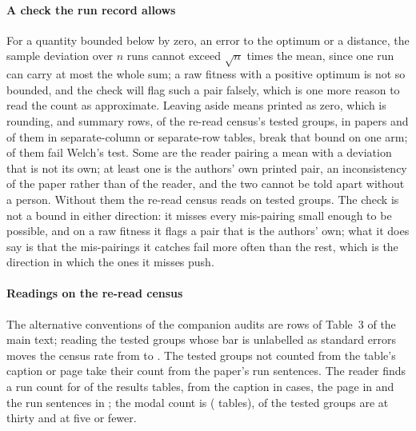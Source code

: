 \documentclass[preprint,review,12pt]{elsarticle}
\begin{document}
\paragraph{A check the run record allows} For a quantity bounded below by zero, an error to the optimum or a distance, the sample deviation over $n$ runs cannot exceed $\sqrt{n}$ times the mean, since one run can carry at most the whole sum; a raw fitness with a positive optimum is not so bounded, and the check will flag such a pair falsely, which is one more reason to read the count as approximate. Leaving aside means printed as zero, which is rounding, and summary rows, \nCrcAlImpossiblePairs{} of the re-read census's tested groups, in \nCrcAlImpossiblePairsPapers{} papers and \nCrcAlImpossiblePairsSeparate{} of them in separate-column or separate-row tables, break that bound on one arm; \nCrcAlImpossiblePairsFail{} of them fail Welch's test. Some are the reader pairing a mean with a deviation that is not its own; at least one is the authors' own printed pair, an inconsistency of the paper rather than of the reader, and the two cannot be told apart without a person. Without them the re-read census reads \nCrcAlWithoutImpossibleFail{} \nCrcAlWithoutImpossibleFailCi{} on \nCrcAlWithoutImpossibleTested{} tested groups. The check is not a bound in either direction: it misses every mis-pairing small enough to be possible, and on a raw fitness it flags a pair that is the authors' own; what it does say is that the mis-pairings it catches fail more often than the rest, which is the direction in which the ones it misses push.

\paragraph{Readings on the re-read census} The alternative conventions of the companion audits are rows of Table~3 of the main text; reading the \nCrcAlUnlabelledTested{} tested groups whose bar is unlabelled as standard errors moves the census rate from \nCrcAllFail{} to \nCrcAlUnlabelledAsSe{}. The \nCrcAlCountFromPaperSentences{} tested groups not counted from the table's caption or page take their count from the paper's run sentences. The reader finds a run count for \nCrcTablesWithRunCount{} of the results tables, from the caption in \nCrcNSourceCaption{} cases, the page in \nCrcNSourcePage{} and the run sentences in \nCrcNSourcePaper{}; the modal count is \nCrcRunsRankOneN{} (\nCrcRunsRankOneCount{} tables), \nCrcRunsTestedNThirty{} of the tested groups are at thirty and \nCrcRunsTestedNAtMostFive{} at five or fewer.
\end{document}
